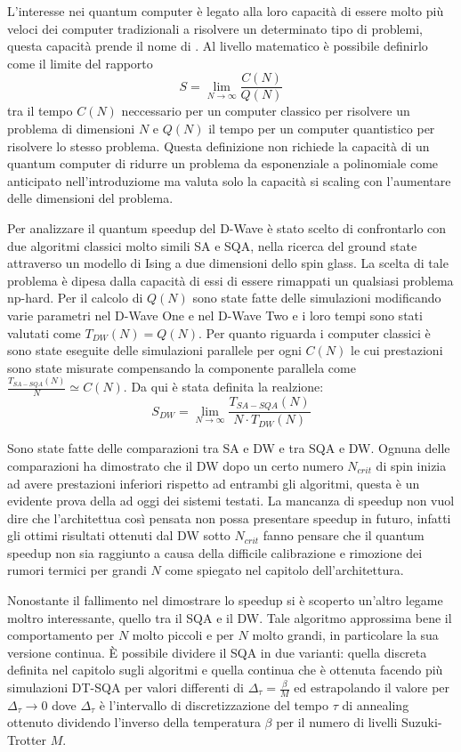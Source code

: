 L'interesse nei quantum computer è legato alla loro capacità di essere molto più veloci dei computer tradizionali a risolvere un determinato tipo di problemi, questa capacità prende il nome di . Al livello matematico è possibile definirlo\cite{DDQS} come il limite del rapporto
$$S = \lim_{N \to \infty} \frac{C(N)}{Q(N)}$$
tra il tempo $C(N)$ neccessario per un computer classico per risolvere un problema di dimensioni $N$ e $Q(N)$ il tempo per un computer quantistico per risolvere lo stesso problema. Questa definizione non richiede la capacità di un quantum computer di ridurre un problema da esponenziale a polinomiale come anticipato nell'introduziome ma valuta solo la capacità si scaling con l'aumentare delle dimensioni del problema.

Per analizzare il quantum speedup del D-Wave è stato scelto di confrontarlo con due algoritmi classici molto simili SA e SQA, nella ricerca del ground state attraverso un modello di Ising a due dimensioni dello spin glass.
La scelta di tale problema è dipesa dalla capacità di essi di essere rimappati un qualsiasi problema np-hard. Per il calcolo di $Q(N)$ sono state fatte delle simulazioni modificando varie parametri nel D-Wave One e nel D-Wave Two e i loro tempi sono stati valutati come $T_{DW}(N) = Q(N)$. Per quanto riguarda i computer classici è sono state eseguite delle simulazioni parallele per ogni $C(N)$ le cui prestazioni sono state misurate compensando la componente parallela\cite{EQA} come
 $\frac{T_{SA-SQA}(N)}{N} \simeq C(N)$. Da qui è stata definita\cite{DDQS} la realzione:
$$S_{DW} = \lim_{N \to \infty} \frac{T_{SA-SQA}(N)}{N \cdot T_{DW}(N)}$$

Sono state fatte delle comparazioni tra SA e DW\cite{DDQS} e tra SQA e DW\cite{QVC}. Ognuna delle comparazioni ha dimostrato che il DW dopo un certo numero $N_{crit}$ di spin inizia ad avere prestazioni inferiori rispetto ad entrambi gli algoritmi, questa è un evidente prova della  ad oggi dei sistemi testati. La mancanza di speedup non vuol dire che l'architettua così pensata non possa presentare speedup in futuro, infatti gli ottimi risultati ottenuti dal DW sotto $N_{crit}$ fanno pensare che il quantum speedup non sia raggiunto a causa della difficile calibrazione e rimozione dei rumori termici per grandi $N$ come spiegato nel capitolo dell'architettura.

Nonostante il fallimento nel dimostrare lo speedup si è scoperto un'altro legame moltro interessante, quello tra il SQA e il DW. Tale algoritmo approssima bene il comportamento per $N$ molto piccoli e per $N$ molto grandi\cite{EQA}, in particolare la sua versione continua\cite{QVC}. È possibile dividere il SQA in due varianti: quella  discreta definita nel capitolo sugli algoritmi e quella  continua che è ottenuta facendo più simulazioni DT-SQA per valori differenti di $\Delta_\tau = \frac{\beta}{M}$ ed estrapolando il valore per $\Delta_\tau \to 0$\cite{EQA,QVC} dove $\Delta_\tau$ è l'intervallo di discretizzazione del tempo $\tau$ di annealing ottenuto dividendo l'inverso della temperatura $\beta$ per il numero di livelli Suzuki-Trotter $M$.


